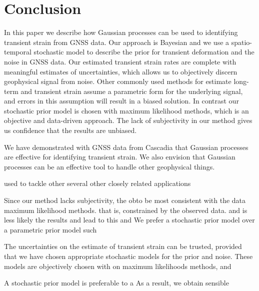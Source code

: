 \documentclass[10pt,a4paper]{article}
\begin{document}
\section{Conclusion}\label{sec:Conclusion}
In this paper we describe how Gaussian processes can be used to identifying transient strain from GNSS data. Our approach is Bayesian and we use a spatio-temporal stochastic model to describe the prior for transient deformation and the noise in GNSS data. Our estimated transient strain rates are complete with meaningful estimates of uncertainties, which allows us to objectively discern geophysical signal from noise.  Other commonly used methods for estimate long-term and transient strain assume a parametric form for the underlying signal, and errors in this assumption will result in a biased solution. In contrast our stochastic prior model is chosen with maximum likelihood methods, which is an objective and data-driven approach. The lack of subjectivity in our method gives us confidence that the results are unbiased.

We have demonstrated with GNSS data from Cascadia that Gaussian processes are effective for identifying transient strain. We also envision that Gaussian processes can be an effective tool to handle other geophysical things.

used to tackle other several other closely related applications 

Since our method lacks subjectivity, the obto be most consistent with the data  maximum likelihood methods.  that is, constrained by the observed data. and is less likely the results and lead to this and We prefer a stochastic prior model over a parametric prior model such  

The uncertainties on the estimate of transient strain can be trusted, provided that we have chosen appropriate stochastic models for the prior and noise. These models are objectively chosen with on maximum likelihoods methods, and 

A stochastic prior model is preferable to a As a result, we obtain sensible 





\end{document}
